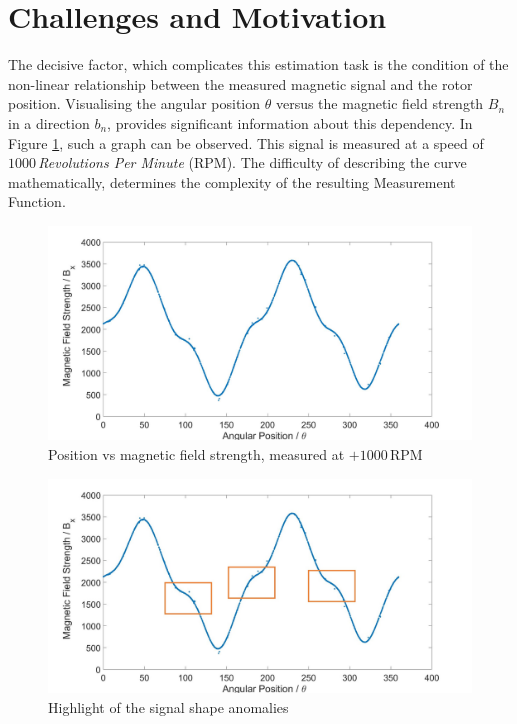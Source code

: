 \documentclass[english]{isasthesis}
\begin{document}
    	\section{Challenges and Motivation} \label{motivation}
    	The decisive factor, which complicates this estimation task is the condition of the non-linear relationship between the measured magnetic signal and the rotor position. Visualising the angular position $\theta$ versus the magnetic field strength $B_n$ in a direction $b_n$, provides significant information about this dependency. In Figure \ref{fig:1000RPM_old_pos}, such a graph can be observed. This signal is measured at a speed of $1000\,$\textit{Revolutions Per Minute} (RPM). The difficulty of describing the curve mathematically, determines the complexity of the resulting Measurement Function.
    	\begin{figure}[t]
                \centering
                \includegraphics[width=1\textwidth]{figures/1000RPM_old_pos.jpg}
                \caption{Position vs magnetic field strength, measured at $+1000\,$RPM}
                \label{fig:1000RPM_old_pos}
     \end{figure}
     \begin{figure}[p]
                \centering
                \includegraphics[width=1\textwidth]{figures/dips_1000RPM_1.jpg}
                \caption{Highlight of the signal shape anomalies}
                \label{fig:curve_dips}
     \end{figure}
\end{document}
